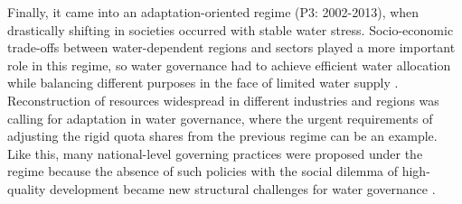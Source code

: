 Finally, it came into an adaptation-oriented regime (P3: 2002-2013), when drastically shifting in societies occurred with stable water stress.
Socio-economic trade-offs between water-dependent regions and sectors played a more important role in this regime, so water governance had to achieve efficient water allocation while balancing different purposes in the face of limited water supply
\cite{dalinBalancingwaterresource2015}.
Reconstruction of resources widespread in different industries and regions was calling for adaptation in water governance, where the urgent requirements of adjusting the rigid quota shares from the previous regime can be an example.
Like this, many national-level governing practices were proposed under the regime because the absence of such policies with the social dilemma of high-quality development became new structural challenges for water governance
\cite{konarExpandingScopeFoundation2019}.

